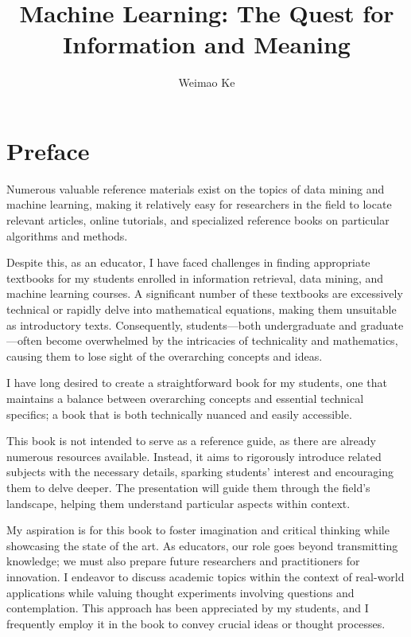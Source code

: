 \documentclass[
  letterpaper,
]{scrbook}
\title{Machine Learning: The Quest for Information and Meaning}
\author{Weimao Ke}
\date{}
\renewcommand*\contentsname{Table of contents}
\newcommand\contentsname{Table of contents}
\begin{document}
\frontmatter
\maketitle

\renewcommand*\contentsname{Table of contents}
{
\setcounter{tocdepth}{2}
\tableofcontents
}
\listoffigures
\listoftables

\mainmatter
{}

\chapter*{Preface}\label{preface}


Numerous valuable reference materials exist on the topics of data mining
and machine learning, making it relatively easy for researchers in the
field to locate relevant articles, online tutorials, and specialized
reference books on particular algorithms and methods.

Despite this, as an educator, I have faced challenges in finding
appropriate textbooks for my students enrolled in information retrieval,
data mining, and machine learning courses. A significant number of these
textbooks are excessively technical or rapidly delve into mathematical
equations, making them unsuitable as introductory texts. Consequently,
students---both undergraduate and graduate---often become overwhelmed by
the intricacies of technicality and mathematics, causing them to lose
sight of the overarching concepts and ideas.

I have long desired to create a straightforward book for my students,
one that maintains a balance between overarching concepts and essential
technical specifics; a book that is both technically nuanced and easily
accessible.

This book is not intended to serve as a reference guide, as there are
already numerous resources available. Instead, it aims to rigorously
introduce related subjects with the necessary details, sparking
students' interest and encouraging them to delve deeper. The
presentation will guide them through the field's landscape, helping them
understand particular aspects within context.

My aspiration is for this book to foster imagination and critical
thinking while showcasing the state of the art. As educators, our role
goes beyond transmitting knowledge; we must also prepare future
researchers and practitioners for innovation. I endeavor to discuss
academic topics within the context of real-world applications while
valuing thought experiments involving questions and contemplation. This
approach has been appreciated by my students, and I frequently employ it
in the book to convey crucial ideas or thought processes.
\end{document}
